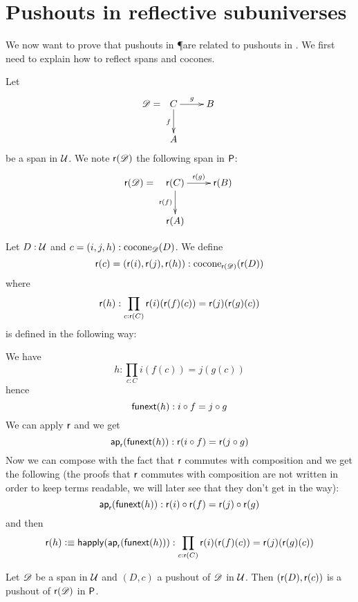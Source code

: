 \section{Pushouts in reflective subuniverses}
\label{sec:pushouts-subuniv}

We now want to prove that pushouts in \P are related to pushouts in \type. We
first need to explain how to reflect spans and cocones.

\begin{defn}
  Let
  \[\Ddiag=\xymatrix{C \ar^g[r] \ar_f[d] & B \\ A & }\]
  be a span in $\type$. We note $\reflect(\Ddiag)$ the following
  span in $\P$:
  \[\reflect(\Ddiag)=\xymatrix{\reflect(C) \ar^{\reflect(g)}[r]
    \ar_{\reflect(f)}[d] & \reflect(B) \\ \reflect(A) & }\]
\end{defn}

\begin{defn}
  Let $D:\type$ and $c=(i,j,h):\cocone{\Ddiag}{D}$.
  We define
  \[\reflect(c)=(\reflect(i),\reflect(j),\reflect(h)):
  \cocone{\reflect(\Ddiag)}{\reflect(D)}\]
  where
  \[\reflect(h):\prod_{c:\reflect(C)}\reflect(i)(\reflect(f)(c))=\reflect(j)(\reflect(g)(c))\]
  is defined in the following way:

  We have \[h:\prod_{c:C}i(f(c))=j(g(c))\]
  hence
  \[\funext(h):i\circ{}f=j\circ{}g\]
  We can apply $\reflect$ and we get
  \[\mapfunc{\reflect}(\funext(h)):\reflect(i\circ{}f)=\reflect(j\circ{}g)\]
  Now we can compose with the fact that $\reflect$ commutes with composition and
  we get the following (the proofs that $\reflect$ commutes with composition are
  not written in order to keep terms readable, we will later see that they don't
  get in the way):
  \[\mapfunc{\reflect}(\funext(h)):
  \reflect(i)\circ\reflect(f)=\reflect(j)\circ\reflect(g)\]
  and then
  \[\reflect(h)\defeq\happly(\mapfunc{\reflect}(\funext(h))):
  \prod_{c:\reflect(C)}\reflect(i)(\reflect(f)(c))=\reflect(j)(\reflect(g)(c))\]
\end{defn}

\begin{lem}
  \label{reflectcommutespushout}
  Let $\Ddiag$ be a span in $\type$ and $(D,c)$ a pushout of $\Ddiag$
  in $\type$. Then $(\reflect(D),\reflect(c))$ is a pushout of
  $\reflect(\Ddiag)$ in $\P$.
\end{lem}

